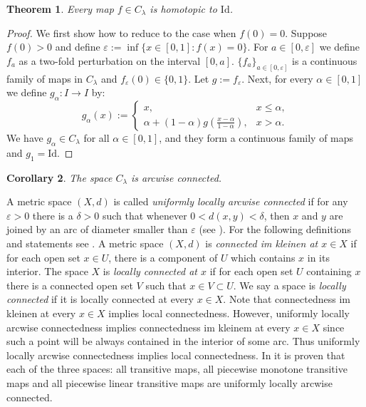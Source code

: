 \documentclass[12pt, a4paper]{amsart}
\newtheorem{theorem}{Theorem}[section]
\newtheorem{corollary}[theorem]{Corollary}
\def\eps{\varepsilon}
\newcommand{\?}{{\bf ???}}
\begin{document}
\begin{theorem}\label{thm:ac}
Every map $f\in C_{\lambda}$ is homotopic to $\mathrm{Id}$.
\end{theorem}
\begin{proof}
We first show how to reduce  to the case when $f(0)=0$. 
 Suppose $f(0)>0$ and define $\eps:=\inf \{x \in [0,1]: f(x)=0\}$. 
For $a\in [0,\eps]$ we define $f_a$ as a two-fold perturbation on the interval $[0,a]$. $\{f_a\}_{a\in [0,\eps]}$ is a continuous family of maps in $C_{\lambda}$ and $f_{\eps}(0) \in \{0,1\}$. Let $g :=f_\eps$. 
Next, for every $\alpha\in [0,1]$ we define $g_{\alpha}:I\to I$ by: 
$$
g_{\alpha}(x):=\begin{cases}
x,& x\leq \alpha,\\
\alpha + (1-\alpha)g(\frac{x-\alpha}{1-\alpha}), & x>\alpha.
\end{cases}
$$
We have $g_{\alpha}\in C_{\lambda}$ for all $\alpha\in[0,1]$, and they form a continuous family of maps and $g_1=\textrm{Id}$.
\end{proof}

\begin{corollary}\label{cor:ac}
The space $C_{\lambda}$ is arcwise connected.
\end{corollary}

A metric space $(X,d)$ is called {\it uniformly locally arcwise connected} if for any $\eps>0$ there is a $\delta>0$ such that whenever $0<d(x,y)<\delta$, then $x$ and $y$ are joined by an arc of diameter smaller than $\eps$ (see \cite{HY}). For the following definitions and statements see \cite[Subsections 5.10 and 5.22]{Nadler}. A metric space $(X,d)$ is {\em connected im kleinen at $x\in X$} if for each open set $x\in U$, there is a component of $U$ which contains $x$ in its interior. The space $X$ is {\em locally connected at $x$} if for each open set $U$ containing $x$ there is a connected open set $V$ such that $x\in V\subset U$. We say a space is {\em locally connected} if it is locally connected at every $x\in X$. Note that connectedness im kleinen at every $x\in X$ implies local connectedness. However, uniformly locally arcwise connectedness implies connectedness im kleinem at every $x\in X$ since such a point will be always contained in the interior of some arc. Thus uniformly locally arcwise connectedness implies local connectedness. In \cite{KMS} it is proven that 
each of the three spaces: all transitive maps, all piecewise monotone transitive maps and all piecewise linear transitive maps are uniformly locally arcwise connected. 
\end{document}
